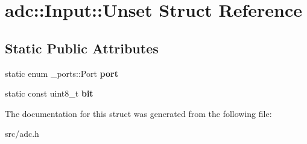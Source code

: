 \hypertarget{structadc_1_1Input_1_1Unset}{}\section{adc\+:\+:Input\+:\+:Unset Struct Reference}
\label{structadc_1_1Input_1_1Unset}
\subsection*{Static Public Attributes}
\begin{DoxyCompactItemize}
\item 
static enum \+\_\+ports\+::\+Port {\bfseries port}\hypertarget{structadc_1_1Input_1_1Unset_a5a9187956ab3442a86fcdec48a6b134f}{}\label{structadc_1_1Input_1_1Unset_a5a9187956ab3442a86fcdec48a6b134f}

\item 
static const uint8\+\_\+t {\bfseries bit}\hypertarget{structadc_1_1Input_1_1Unset_a8fd44d9636034cbba06a1673af4dfa1a}{}\label{structadc_1_1Input_1_1Unset_a8fd44d9636034cbba06a1673af4dfa1a}

\end{DoxyCompactItemize}


The documentation for this struct was generated from the following file\+:\begin{DoxyCompactItemize}
\item 
src/adc.\+h\end{DoxyCompactItemize}
